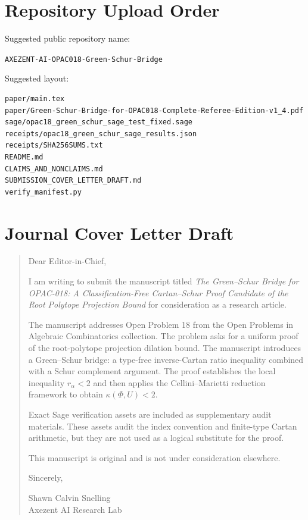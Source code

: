 \documentclass[11pt]{book}
\theoremstyle{definition}
\begin{document}
\chapter{Repository Upload Order}
Suggested public repository name:
\begin{center}
\texttt{AXEZENT-AI-OPAC018-Green-Schur-Bridge}
\end{center}
Suggested layout:
\begin{lstlisting}[style=sage]
paper/main.tex
paper/Green-Schur-Bridge-for-OPAC018-Complete-Referee-Edition-v1_4.pdf
sage/opac18_green_schur_sage_test_fixed.sage
receipts/opac18_green_schur_sage_results.json
receipts/SHA256SUMS.txt
README.md
CLAIMS_AND_NONCLAIMS.md
SUBMISSION_COVER_LETTER_DRAFT.md
verify_manifest.py
\end{lstlisting}

\chapter{Journal Cover Letter Draft}
\begin{quote}
Dear Editor-in-Chief,

I am writing to submit the manuscript titled \emph{The Green--Schur Bridge for OPAC-018: A Classification-Free Cartan--Schur Proof Candidate of the Root Polytope Projection Bound} for consideration as a research article.

The manuscript addresses Open Problem 18 from the Open Problems in Algebraic Combinatorics collection. The problem asks for a uniform proof of the root-polytope projection dilation bound. The manuscript introduces a Green--Schur bridge: a type-free inverse-Cartan ratio inequality combined with a Schur complement argument. The proof establishes the local inequality $r_\alpha<2$ and then applies the Cellini--Marietti reduction framework to obtain $\kappa(\Phi,U)<2$.

Exact Sage verification assets are included as supplementary audit materials. These assets audit the index convention and finite-type Cartan arithmetic, but they are not used as a logical substitute for the proof.

This manuscript is original and is not under consideration elsewhere.

Sincerely,

Shawn Calvin Snelling\\
Axezent AI Research Lab
\end{quote}
\end{document}
